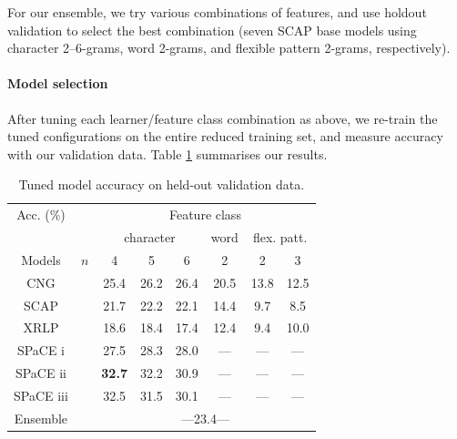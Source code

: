 \documentclass[twocolumn,10pt]{article}
\begin{document}
For our ensemble, we try various combinations of features, and use
holdout validation to select the best combination
(seven SCAP base models using character 2--6-grams, word 2-grams,
and flexible pattern 2-grams, respectively).


\paragraph{Model selection}
After tuning each learner/feature class combination as above,
we re-train the tuned configurations on the entire reduced
training set, and measure accuracy with our validation data.
Table \ref{tab:devresults} summarises our results.

\begin{table}[h]
\centering
\begin{tabular}{@{}cccccccc@{}}
\cmidrule{3-8}
Acc. (\%)   &     & \multicolumn{6}{c}{Feature class}                    \\
\cmidrule{3-8} 
            &     & \multicolumn{3}{c}{character} & word  & \multicolumn{2}{c}{flex. patt.} \\
\cmidrule(r){1-1} \cmidrule(rl){3-5} \cmidrule(rl){6-6} \cmidrule(rl){7-8} 
Models      & $n$ & 4      & 5      & 6           & 2     & 2     & 3    \\
\cmidrule(r){1-1} \cmidrule{3-8} 
CNG         &     & 25.4   & 26.2   & 26.4        & 20.5  & 13.8  & 12.5 \\
SCAP        &     & 21.7   & 22.2   & 22.1        & 14.4  &  9.7  &  8.5 \\
XRLP%
            &     & 18.6   & 18.4   & 17.4        & 12.4  &  9.4  & 10.0 \\
SPaCE i     &     & 27.5   & 28.3   & 28.0        & ---   & ---   & ---  \\
SPaCE ii    & &{\bf 32.7}  & 32.2   & 30.9        & ---   & ---   & ---  \\
SPaCE iii   &     & 32.5   & 31.5   & 30.1        & ---   & ---   & ---  \\
                  \cmidrule{3-8} 
Ensemble    &     & \multicolumn{6}{c}{ ---23.4--- }\\ %
\bottomrule
\end{tabular}
\caption{Tuned model accuracy on held-out validation data.}
\label{tab:devresults}
\end{table}
\end{document}

